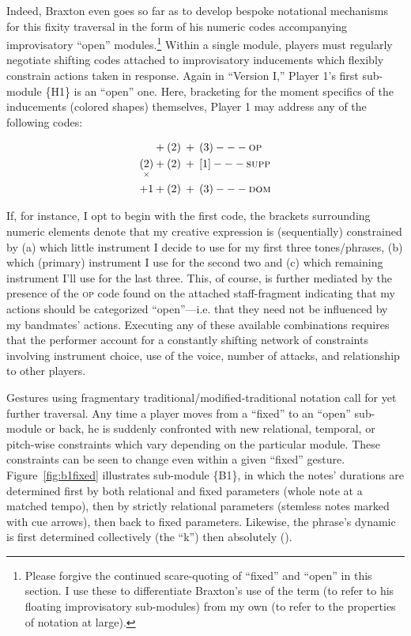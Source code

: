         Indeed, Braxton even goes so far as to develop bespoke notational mechanisms for this fixity traversal in the form of his numeric codes accompanying improvisatory ``open'' modules.\footnote{Please forgive the continued scare-quoting of ``fixed'' and ``open'' in this section. I use these to differentiate Braxton's use of the term (to refer to his floating improvisatory sub-modules) from my own (to refer to the properties of notation at large).} Within a single module, players must regularly negotiate shifting codes attached to improvisatory inducements which flexibly constrain actions taken in response. Again in ``Version I,'' Player 1's first sub-module \{H1\} is an ``open'' one. Here, bracketing for the moment specifics of the inducements (colored shapes) themselves, Player 1 may address any of the following codes:


        \vspace{-15pt}
            \begin{align}
                [3]\:+&\:(2)\:+\:(3)---\textsc{op} \\
                \underset{\times}{(2)}\:+&\:(2)\:+\:[1]---\textsc{supp} \\
                +1\:+&\:(2)\:+\:(3)---\textsc{dom}
            \end{align}

        If, for instance, I opt to begin with the first code, the brackets surrounding numeric elements denote that my creative expression is (sequentially) constrained by (a) which little instrument I decide to use for my first three tones/phrases, (b) which (primary) instrument I use for the second two and (c) which remaining instrument I'll use for the last three. This, of course, is further mediated by the presence of the \textsc{op} code found on the attached staff-fragment indicating that my actions should be categorized ``open''---i.e. that they need not be influenced by my bandmates' actions. Executing any of these available combinations requires that the performer account for a constantly shifting network of constraints involving instrument choice, use of the voice, number of attacks, and relationship to other players.

        Gestures using fragmentary traditional/modified-traditional notation call for yet further traversal. Any time a player moves from a ``fixed'' to an ``open'' sub-module or back, he is suddenly confronted with new relational, temporal, or pitch-wise constraints which vary depending on the particular module. These constraints can be seen to change even within a given ``fixed'' gesture. Figure~\ref{fig:b1fixed} illustrates sub-module \{B1\}, in which the notes' durations are determined first by both relational and fixed parameters (whole note at a matched tempo), then by strictly relational parameters (stemless notes marked with cue arrows), then back to fixed parameters. Likewise, the phrase's dynamic is first determined collectively (the ``k'') then absolutely ().
        
